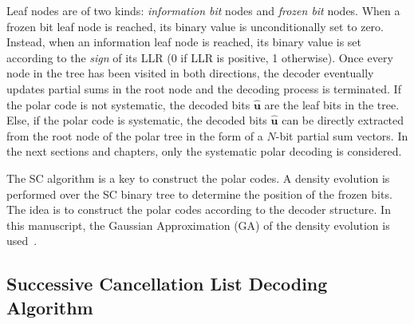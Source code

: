 Leaf nodes are of two kinds: \emph{information bit} nodes and \emph{frozen bit}
nodes. When a frozen bit leaf node is reached, its binary value is
unconditionally set to zero. Instead, when an information leaf node is reached,
its binary value is set according to the \emph{sign} of its LLR (0 if LLR is
positive, 1 otherwise). Once every node in the tree has been visited in both
directions, the decoder eventually updates partial sums in the root node and the
decoding process is terminated. If the polar code is not systematic, the decoded
bits $\bm{\hat{u}}$ are the leaf bits in the tree. Else, if the polar code is
systematic, the decoded bits $\bm{\hat{u}}$ can be directly extracted from the
root node of the polar tree in the form of a $N$-bit partial sum vectors. In the
next sections and chapters, only the systematic polar decoding is considered.

The SC algorithm is a key to construct the polar codes. A density evolution
is performed over the SC binary tree to determine the position of the frozen
bits. The idea is to construct the polar codes according to the decoder
structure. In this manuscript, the Gaussian Approximation (GA) of the density
evolution is used~\cite{Trifonov2012}.

\subsection{Successive Cancellation List Decoding Algorithm}


